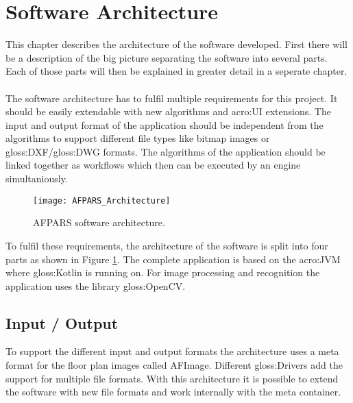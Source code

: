 \section{Software Architecture}
This chapter describes the architecture of the software developed. First there will be a description of the big picture separating the software into several parts. Each of those parts will then be explained in greater detail in a seperate chapter.
\\\\
The software architecture has to fulfil multiple requirements for this project. It should be easily extendable with new algorithms and \acrshort{acro:UI} extensions. The input and output format of the application should be independent from the algorithms to support different file types like bitmap images or \gls{gloss:DXF}/\gls{gloss:DWG} formats. The algorithms of the application should be linked together as workflows which then can be executed by an engine simultaniously.

\begin{figure}[h]
  \centering
      \texttt{[image: AFPARS\_Architecture]}
  \caption{AFPARS software architecture.}
  \label{fig:AFPARS_Architecture}
\end{figure}


To fulfil these requirements, the architecture of the software is split into four parts as shown in Figure \ref{fig:AFPARS_Architecture}. The complete application is based on the \acrfull{acro:JVM} where \gls{gloss:Kotlin} is running on. For image processing and recognition the application uses the library \gls{gloss:OpenCV}.


\pagebreak

\subsection{Input / Output}
To support the different input and output formats the architecture uses a meta format for the
floor plan images called AFImage. Different \gls{gloss:Drivers}  add the support for multiple file formats. With this architecture it is possible to extend the software with new file formats and work internally with the meta container.

